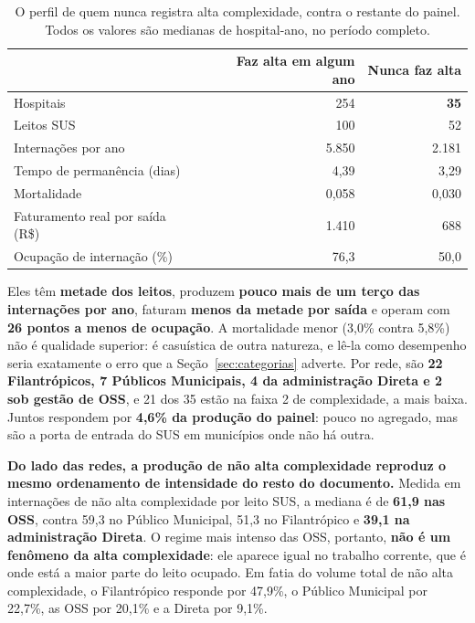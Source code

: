 \begin{table}[H]
\centering
\caption{O perfil de quem nunca registra alta complexidade, contra o
restante do painel. Todos os valores são medianas de hospital-ano, no
período completo.}
\label{tab:sonaoalta}
\small
\begin{tabular}{lrr}
\toprule
 & Faz alta em algum ano & Nunca faz alta \\
\midrule
Hospitais                        & 254   & \textbf{35} \\
Leitos SUS                       & 100   & 52 \\
Internações por ano              & 5.850 & 2.181 \\
Tempo de permanência (dias)      & 4,39  & 3,29 \\
Mortalidade                      & 0,058 & 0,030 \\
Faturamento real por saída (R\$) & 1.410 & 688 \\
Ocupação de internação (\%)      & 76,3  & 50,0 \\
\bottomrule
\end{tabular}
\end{table}


Eles têm \textbf{metade dos leitos}, produzem \textbf{pouco mais de um terço
das internações por ano}, faturam \textbf{menos da metade por saída} e operam com
\textbf{26 pontos a menos de ocupação}. A mortalidade menor (3,0\% contra
5,8\%) não é qualidade superior: é casuística de outra natureza, e lê-la
como desempenho seria exatamente o erro que a Seção~\ref{sec:categorias}
adverte. Por rede, são \textbf{22 Filantrópicos, 7 Públicos Municipais, 4 da
administração Direta e 2 sob gestão de OSS}, e 21 dos 35 estão na faixa 2 de
complexidade, a mais baixa. Juntos respondem por \textbf{4,6\% da produção do
painel}: pouco no agregado, mas são a porta de entrada do SUS em municípios
onde não há outra.

\textbf{Do lado das redes, a produção de não alta complexidade reproduz o
mesmo ordenamento de intensidade do resto do documento.} Medida em
internações de não alta complexidade por leito SUS, a mediana é de
\textbf{61,9 nas OSS}, contra 59,3 no Público Municipal, 51,3 no
Filantrópico e \textbf{39,1 na administração Direta}. O regime mais intenso
das OSS, portanto, \textbf{não é um fenômeno da alta complexidade}: ele
aparece igual no trabalho corrente, que é onde está a maior parte do leito
ocupado. Em fatia do volume total de não alta complexidade, o
Filantrópico responde por 47,9\%, o Público Municipal por 22,7\%, as OSS por
20,1\% e a Direta por 9,1\%.

